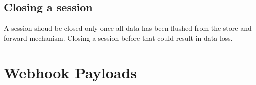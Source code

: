 \documentclass[letterpaper,10pt,english]{sphinxmanual}
\begin{document}
\begin{sphinxVerbatim}[commandchars=\\\{\}]
 

    
\end{sphinxVerbatim}


\subsection{Closing a session}
\label{\detokenize{loads/drivers/sessions/session-management:closing-a-session}}
A session shoud be closed only once all data has been flushed from the store and forward mechanism. Closing a session before that could result in data loss.



\section{Webhook Payloads}
\label{\detokenize{loads/web-hooks/payloads:webhook-payloads}}\label{\detokenize{loads/web-hooks/payloads::doc}}
\end{document}
